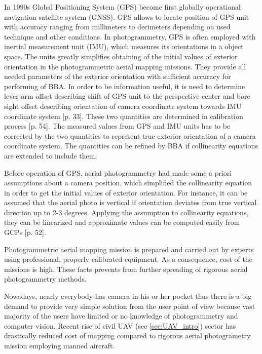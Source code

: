 \documentclass[a4paper,12pt]{article}
\begin{document}
In 1990s Global Positioning System (GPS) become first globally operational navigation satellite system (GNSS).
GPS allows 
to locate position of GPS unit with accuracy ranging  from  millimeters to decimeters depending 
on used technique and other conditions. 
In photogrammetry, GPS is often employed with inertial measurement unit (IMU), which measures its orientations in a object space.
The units greatly simplifies obtaining of the initial values of exterior orientation in the photogrammetric aerial mapping missions.
They provide all needed parameters of the exterior orientation with sufficient accuracy for performing of BBA. 
In order to be information useful, it is need to determine 
lever-arm offset describing shift of GPS unit to the perspective center and bore sight offset
describing orientation of camera coordinate system towards IMU coordinate system \cite{perry2009synthesized}[p. 33]. These two
quantities are determined in calibration process \cite{perry2009synthesized}[p. 54]. The measured values from GPS and IMU units has to
be corrected by the two quantities to represent true exterior orientation of a camera coordinate system. The quantities
can be refined by BBA if collinearity equations are extended to include them.

\label{sec:assum}
Before operation of GPS, aerial photogrammetry had made some a priori assumptions about a camera position,
which simplified the collinearity equation in order to get the initial values of exterior orientation. 
For instance, it can be assumed that the aerial photo is vertical if orientation deviates from true vertical
direction up to 2-3 degrees. Applying the assumption to collinearity equations, they can be linearized and 
approximate values can be computed easily from GCPs \cite{pavelka2004foto20}[p. 52].

Photogrammetric aerial mapping mission is prepared and carried out by experts using 
professional, properly calibrated equipment.
As a consequence, cost of the missions
is high. These facts prevents from further spreading of rigorous aerial photogrammetry methods.

Nowadays, nearly everybody has camera in his or her pocket thus there is a big demand 
to provide very simple solution from the user point of view because 
vast majority of the users have limited or no knowledge of photogrammetry and computer vision. 
 Recent rise of civil UAV (see \ref{sec:UAV_intro}) sector has drastically reduced cost of mapping   
  compared to rigorous aerial photogrametry mission employing manned aircraft.
\end{document}
